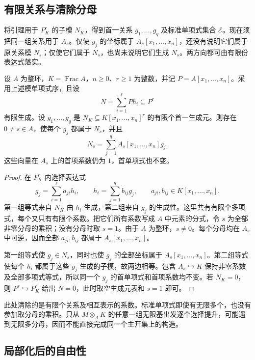 \subsection{有限关系与清除分母}
\label{g5:subsec:0603:03}

将引理用于 \(P_K^r\) 的子模 \(N_K\)，得到首一关系 \(g_1,\ldots,g_q\) 及标准单项式集合 \(\mathcal E\)。现在须把同一组关系用于 \(A_s\)。仅使 \(g_j\) 的坐标属于 \(A_s[x_1,\ldots,x_n]\)，还没有说明它们属于原关系模 \(N_s\)；仅使它们属于 \(N_s\)，也尚未说明它们生成 \(N_s\)。两方向都可由有限份表达式落实。

\begin{lemma}\label{g5:lem:spread-monic-relations}
	设 \(A\) 为整环，\(K=\operatorname{Frac}A\)，\(n\geq0\)、\(r\geq1\) 为整数，并记 \(P=A[x_1,\ldots,x_n]\)。采用上述模单项式序，且设
	\[
		N=\sum_{i=1}^{\ell}Ph_i\subseteq P^r
	\]
	有限生成。设 \(g_1,\ldots,g_q\) 是 \(N_K\subseteq K[x_1,\ldots,x_n]^r\) 的有限个首一生成元。则存在 \(0\ne s\in A\)，使每个 \(g_j\) 都属于 \(N_s\)，并且
	\[
		N_s=\sum_{j=1}^q A_s[x_1,\ldots,x_n]g_j.
	\]
	这些向量在 \(A_s\) 上的首项系数仍为 \(1\)，首单项式也不变。
\end{lemma}
\begin{proof}
	在 \(P_K^r\) 内选择表达式
	\[
		g_j=\sum_{i=1}^{\ell}a_{ji}h_i,
		\qquad
		h_i=\sum_{j=1}^q b_{ij}g_j,
		\qquad a_{ji},b_{ij}\in K[x_1,\ldots,x_n].
	\]
	第一组等式来自 \(N_K\) 由 \(h_i\) 生成，第二组来自 \(g_j\) 的生成性。这里共有有限个多项式，每个又只有有限个系数。把它们所有系数写成 \(A\) 中元素的分式，令 \(s\) 为全部非零分母的乘积；没有分母时取 \(s=1\)。由于 \(A\) 为整环，\(s\ne0\)。每个分母均在 \(A_s\) 中可逆，因而全部 \(a_{ji},b_{ij}\) 都属于 \(A_s[x_1,\ldots,x_n]\)。

	第一组等式使 \(g_j\in N_s\)，同时也使 \(g_j\) 的全部坐标属于 \(A_s[x_1,\ldots,x_n]\)。第二组等式使每个 \(h_i\) 都属于这些 \(g_j\) 生成的子模，故两边相等。包含 \(A_s\hookrightarrow K\) 保持非零系数及全部多项式等式，所以同一个 \(g_j\) 的首单项式和首项系数均不变。若 \(N_K=0\)，则 \(P^r\hookrightarrow P_K^r\) 给出 \(N=0\)，此时取空生成元表和 \(s=1\) 即可。
\end{proof}

此处清除的是有限个关系及相互表示的系数。标准单项式即使有无限多个，也没有参加取分母的乘积。只从 \(M\otimes_A K\) 的任意一组无限基出发逐个选择提升，可能遇到无限多分母，因而不能直接完成同一个主开集上的构造。

\subsection{局部化后的自由性}
\label{g5:subsec:0603:04}

